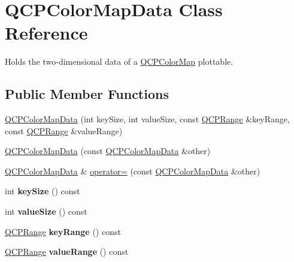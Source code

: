 \hypertarget{class_q_c_p_color_map_data}{}\section{Q\+C\+P\+Color\+Map\+Data Class Reference}
\label{class_q_c_p_color_map_data}


Holds the two-\/dimensional data of a \hyperlink{class_q_c_p_color_map}{Q\+C\+P\+Color\+Map} plottable.  


\subsection*{Public Member Functions}
\begin{DoxyCompactItemize}
\item 
\hyperlink{class_q_c_p_color_map_data_aac9d8eb81e18e240d89d56c01933fd23}{Q\+C\+P\+Color\+Map\+Data} (int key\+Size, int value\+Size, const \hyperlink{class_q_c_p_range}{Q\+C\+P\+Range} \&key\+Range, const \hyperlink{class_q_c_p_range}{Q\+C\+P\+Range} \&value\+Range)
\item 
\hyperlink{class_q_c_p_color_map_data_a7f2145d86473263494abb9bf1de20436}{Q\+C\+P\+Color\+Map\+Data} (const \hyperlink{class_q_c_p_color_map_data}{Q\+C\+P\+Color\+Map\+Data} \&other)
\item 
\hyperlink{class_q_c_p_color_map_data}{Q\+C\+P\+Color\+Map\+Data} \& \hyperlink{class_q_c_p_color_map_data_afdf4dd1b2f5714234fe84709b85c2a8d}{operator=} (const \hyperlink{class_q_c_p_color_map_data}{Q\+C\+P\+Color\+Map\+Data} \&other)
\item 
\mbox{\label{class_q_c_p_color_map_data_abbda4d28de97aedce1e6e6f008a0a1f7}} 
int {\bfseries key\+Size} () const
\item 
\mbox{\label{class_q_c_p_color_map_data_a8510cafea24645bbb62b5e0bfc43209f}} 
int {\bfseries value\+Size} () const
\item 
\mbox{\label{class_q_c_p_color_map_data_a1e43abd20a77b922b7cecfc69bf4dad7}} 
\hyperlink{class_q_c_p_range}{Q\+C\+P\+Range} {\bfseries key\+Range} () const
\item 
\mbox{\label{class_q_c_p_color_map_data_a818e4e384aa4e5fad69ac603924394d3}} 
\hyperlink{class_q_c_p_range}{Q\+C\+P\+Range} {\bfseries value\+Range} () const

\end{DoxyCompactItemize}
